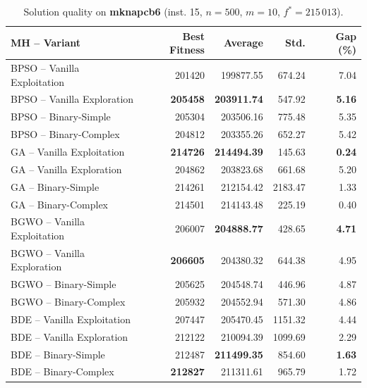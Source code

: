 \documentclass[journal,article,submit,moreauthors]{Definitions/mdpi}
\begin{document}
\begin{table}[htbp]
  \centering
  \small
  \caption{Solution quality on \textbf{mknapcb6} (inst. 15, $n=500$, $m=10$, $f^*=215\,013$).}
  \label{tab:calidad_mknapcb6_15}
  \begin{tabular}{lrrrr}
    \toprule
    \textbf{MH -- Variant} &
    \textbf{Best Fitness} &
    \textbf{Average} &
    \textbf{Std.} &
    \textbf{Gap (\%)} \\
    \midrule
    BPSO -- Vanilla Exploitation &         201420 &        199877.55 & 674.24 &         7.04 \\
    BPSO -- Vanilla Exploration  & \textbf{205458} & \textbf{203911.74} & 547.92 & \textbf{5.16} \\
    BPSO -- Binary-Simple        &         205304 &        203506.16 & 775.48 &         5.35 \\
    BPSO -- Binary-Complex       &         204812 &        203355.26 & 652.27 &         5.42 \\
    \midrule
    GA -- Vanilla Exploitation   & \textbf{214726} & \textbf{214494.39} & 145.63 & \textbf{0.24} \\
    GA -- Vanilla Exploration    &         204862 &        203823.68 & 661.68 &         5.20 \\
    GA -- Binary-Simple          &         214261 &        212154.42 & 2183.47 &         1.33 \\
    GA -- Binary-Complex         &         214501 &        214143.48 & 225.19 &         0.40 \\
    \midrule
    BGWO -- Vanilla Exploitation &         206007 & \textbf{204888.77} & 428.65 & \textbf{4.71} \\
    BGWO -- Vanilla Exploration  & \textbf{206605} &        204380.32 & 644.38 &         4.95 \\
    BGWO -- Binary-Simple        &         205625 &        204548.74 & 446.96 &         4.87 \\
    BGWO -- Binary-Complex       &         205932 &        204552.94 & 571.30 &         4.86 \\
    \midrule
    BDE -- Vanilla Exploitation  &         207447 &        205470.45 & 1151.32 &         4.44 \\
    BDE -- Vanilla Exploration   &         212122 &        210094.39 & 1099.69 &         2.29 \\
    BDE -- Binary-Simple         &         212487 & \textbf{211499.35} & 854.60 & \textbf{1.63} \\
    BDE -- Binary-Complex        & \textbf{212827} &        211311.61 & 965.79 &         1.72 \\
    \bottomrule
  \end{tabular}
\end{table}
\end{document}
